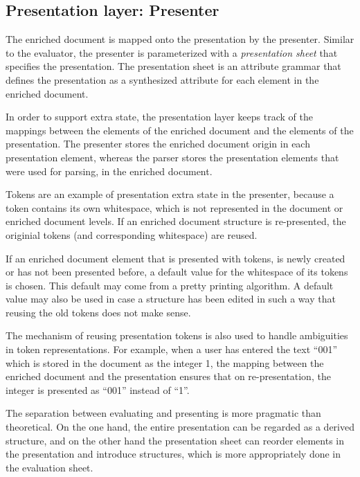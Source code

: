 %																
\subsection{Presentation layer: Presenter} \label{sect:presenter}

The enriched document is mapped onto the presentation by the presenter. Similar to the evaluator, the presenter is parameterized with a {\em presentation sheet} that specifies the presentation. The presentation sheet is an attribute grammar that defines the presentation as a synthesized attribute for each element in the enriched document. 

In order to support extra state, the presentation layer keeps track of the mappings between the elements of the enriched document and the elements of the presentation. The presenter stores the enriched document origin in each presentation element, whereas the parser stores the presentation elements that were used for parsing, in the enriched document.

Tokens are an example of presentation extra state in the presenter, because a token contains its own whitespace, which is not represented in the document or enriched document levels. If an enriched document structure is re-presented, the originial tokens (and corresponding white\-space) are reused. 

If an enriched document element that is presented with tokens, is newly created or has not been presented before, a default value for the whitespace of its tokens is chosen. This default may come from a pretty printing algorithm. A default value may also be used in case a structure has been edited in such a way that reusing the old tokens does not make sense.

The mechanism of reusing presentation tokens is also used to handle ambiguities in token representations. For example, when a user has entered the text ``001'' which is stored in the document as the integer 1, the mapping between the enriched document and the presentation ensures that on re-presentation, the integer is presented as ``001'' instead of ``1''.

The separation between evaluating and presenting is more pragmatic than theoretical. On the one hand, the entire presentation can be regarded as a derived structure, and on the other hand the presentation sheet can reorder elements in the presentation and introduce structures, which is more appropriately done in the evaluation sheet. 

